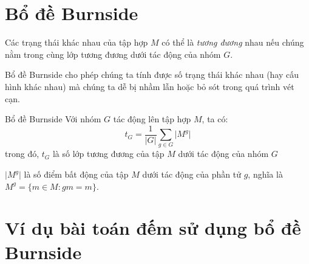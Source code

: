 \section{Bổ đề Burnside}

Các trạng thái khác nhau của tập hợp $M$ có thể là \textit{tương đương} nhau nếu chúng nằm trong cùng lớp tương đương dưới tác động của nhóm $G$.

Bổ đề Burnside cho phép chúng ta tính được số trạng thái khác nhau (hay cấu hình khác nhau) mà chúng ta dễ bị nhầm lẫn hoặc bỏ sót trong quá trình vét cạn.

\begin{lemma}{Bổ đề Burnside}
    Với nhóm $G$ tác động lên tập hợp $M$, ta có:
    \[t_G = \frac{1}{\lvert G \rvert} \sum_{g \in G} \lvert M^g \rvert \]
    trong đó, $t_G$ là số lớp tương đương của tập $M$ dưới tác động của nhóm $G$

    $\lvert M^g \rvert$ là số điểm bất động của tập $M$ dưới tác động của phần tử $g$, nghĩa là $M^g = \{ m \in M : gm = m\}$.
\end{lemma}

\section{Ví dụ bài toán đếm sử dụng bổ đề Burnside}

